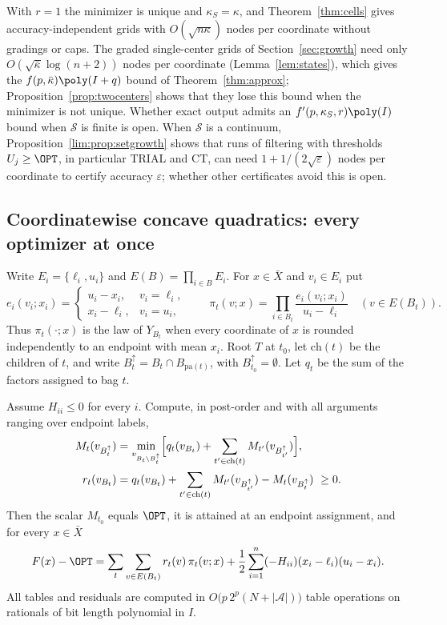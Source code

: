 \begin{remark}\label{rem:grading}
With $r=1$ the minimizer is unique and $\kappa_S=\kappa$, and
Theorem~\ref{thm:cells} gives accuracy-independent grids with
$O(\sqrt{n\kappa})$ nodes per coordinate without gradings or caps. The graded
single-center grids of Section~\ref{sec:growth} need only
$O(\sqrt{\bar\kappa}\log(n+2))$ nodes per coordinate (Lemma~\ref{lem:states}),
which gives the $f(p,\bar\kappa)\poly(I+q)$ bound of
Theorem~\ref{thm:approx}; Proposition~\ref{prop:twocenters} shows that they
lose this bound when the minimizer is not unique. Whether exact output admits
an $f'(p,\kappa_S,r)\poly(I)$ bound when $\mathcal S$ is finite is open. When
$\mathcal S$ is a continuum, Proposition~\ref{lim:prop:setgrowth} shows that
runs of filtering with thresholds $U_j\ge\OPT$, in particular TRIAL and CT,
can need $1+1/(2\sqrt\varepsilon)$ nodes per coordinate to certify accuracy
$\varepsilon$; whether other certificates avoid this is open.
\end{remark}


\subsection{Coordinatewise concave quadratics: every optimizer at once}\label{sec:endpointset}

Write $E_i=\{\ell_i,u_i\}$ and $E(B)=\prod_{i\in B}E_i$. For $x\in\bar X$
and $v_i\in E_i$ put
\[
e_i(v_i;x_i)=\begin{cases}u_i-x_i,&v_i=\ell_i,\\ x_i-\ell_i,&v_i=u_i,\end{cases}
\qquad
\pi_t(v;x)=\prod_{i\in B_t}\frac{e_i(v_i;x_i)}{u_i-\ell_i}\quad(v\in E(B_t)).
\]
Thus $\pi_t(\cdot;x)$ is the law of $Y_{B_t}$ when every coordinate of $x$
is rounded independently to an endpoint with mean $x_i$. Root $T$ at $t_0$,
let $\mathrm{ch}(t)$ be the children of $t$, and write
$B_t^{\uparrow}=B_t\cap B_{\mathrm{pa}(t)}$, with $B_{t_0}^{\uparrow}=\emptyset$.
Let $q_t$ be the sum of the factors assigned to bag $t$.

\begin{lemma}\label{lem:endpointid}
Assume $H_{ii}\le0$ for every $i$. Compute, in post-order and with all
arguments ranging over endpoint labels,
\begin{align*}
M_t(v_{B_t^\uparrow})&=\min_{v_{B_t\setminus B_t^\uparrow}}
\Bigl[q_t(v_{B_t})+\sum_{t'\in\mathrm{ch}(t)}M_{t'}(v_{B_{t'}^\uparrow})\Bigr],\\
r_t(v_{B_t})&=q_t(v_{B_t})+\sum_{t'\in\mathrm{ch}(t)}M_{t'}(v_{B_{t'}^\uparrow})
-M_t(v_{B_t^\uparrow})\ \ge0 .
\end{align*}
Then the scalar $M_{t_0}$ equals $\OPT$, it is attained at an endpoint
assignment, and for every $x\in\bar X$
\begin{equation}\label{eq:endpointid}
F(x)-\OPT=\sum_{t}\sum_{v\in E(B_t)}r_t(v)\,\pi_t(v;x)
+\frac12\sum_{i=1}^n(-H_{ii})(x_i-\ell_i)(u_i-x_i).
\end{equation}
All tables and residuals are computed in
$O\bigl(p\,2^p(N+|\mathcal A|)\bigr)$ table operations on rationals of
bit length polynomial in $I$.
\end{lemma}

